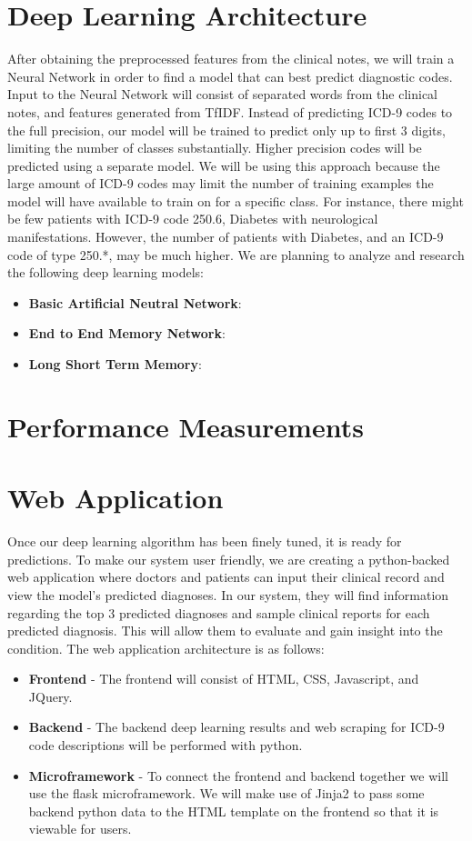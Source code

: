 \documentclass{article}
\begin{document}
\section{Deep Learning Architecture}
After obtaining the preprocessed features from the clinical notes, we will train a Neural Network in order to find a model that can best predict diagnostic codes. Input to the Neural Network will consist of separated words from the clinical notes, and features generated from TfIDF. Instead of predicting ICD-9 codes to the full precision, our model will be trained to predict only up to first 3 digits, limiting the number of classes substantially. Higher precision codes will be predicted using a separate model. We will be using this approach because the large amount of ICD-9 codes may limit the number of training examples the model will have available to train on for a specific class. For instance, there might be few patients with ICD-9 code 250.6, Diabetes with neurological manifestations. However, the number of patients with Diabetes, and an ICD-9 code of type 250.*, may be much higher.  We are planning to analyze and research the following deep learning models: 
\begin{itemize}
\item \textbf{Basic Artificial Neutral Network}:
\item \textbf{End to End Memory Network}:
\item \textbf{Long Short Term Memory}:
\end{itemize}


\section{Performance Measurements}

\section{Web Application}
Once our deep learning algorithm has been finely tuned, it is ready for predictions. To make our system user friendly, we are creating a python-backed web application where doctors and patients can input their clinical record and view the model's predicted diagnoses. In our system, they will find information regarding the top 3 predicted diagnoses and sample clinical reports for each predicted diagnosis. This will allow them to evaluate and gain insight into the condition. The web application architecture is as follows: 
\begin{itemize}
\item \textbf{Frontend} - The frontend will consist of HTML, CSS, Javascript, and JQuery. 
\item \textbf{Backend} - The backend deep learning results and web scraping for ICD-9 code descriptions will be performed with python.
\item \textbf{Microframework} - To connect the frontend and backend together we will use the flask microframework. We will make use of Jinja2 to pass some backend python data to the HTML template on the frontend so that it is viewable for users. 
\end{itemize}
\end{document}
